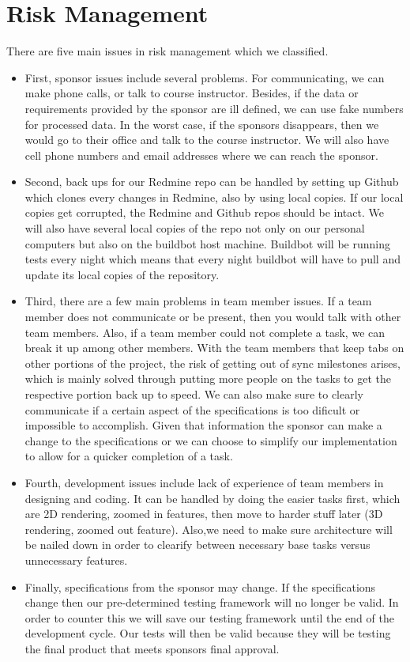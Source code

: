 \documentclass[12pt, letterpaper]{article}
\begin{document}
\section{Risk Management}
There are five main issues in risk management which we classified. 
\begin{itemize}
     \item First, sponsor issues include several problems. For communicating, we
     can make phone calls, or talk to course instructor. Besides, if the data or
     requirements provided by the sponsor are ill defined, we can use fake
     numbers for processed data. In the worst case, if the sponsors disappears,
     then we would go to their office and talk to the course instructor. We will
     also have cell phone numbers and email addresses where we can reach the
     sponsor.
    \item Second, back ups for our Redmine repo can be handled by setting up
    Github which clones every changes in Redmine, also by using local copies. If
    our local copies get corrupted, the Redmine and Github repos should be
    intact. We will also have several local copies of the repo not only on our
    personal computers but also on the buildbot host machine. Buildbot will be
    running tests every night which means that every night buildbot will have to
    pull and update its local copies of the repository.
    \item Third, there are a few main problems in team member issues. If a team
    member does not communicate or be present, then you would talk with other
    team members. Also, if a team member could not complete a task, we can break
    it up among other members. With the team members that keep tabs on other
    portions of the project, the risk of getting out of sync milestones arises,
    which is mainly solved through putting more people on the tasks to get the
    respective portion back up to speed. We can also make sure to clearly
    communicate if a certain aspect of the specifications is too dificult or
    impossible to accomplish. Given that information the sponsor can make a
    change to the specifications or we can choose to simplify our implementation
    to allow for a quicker completion of a task.
	\item Fourth, development issues include lack of experience of team members
    in designing and coding. It can be handled by doing the easier tasks first,
    which are 2D rendering, zoomed in features, then move to harder stuff later
    (3D rendering, zoomed out feature). Also,we need to make sure architecture
    will be nailed down in order to clearify between necessary base tasks versus
    unnecessary features.
    \item Finally, specifications from the sponsor may change. If the
    specifications change then our pre-determined testing framework will no
    longer be valid. In order to counter this we will save our testing framework
    until the end of the development cycle. Our tests will then be valid because
    they will be testing the final product that meets sponsors final approval.
\end{itemize}
\end{document}
